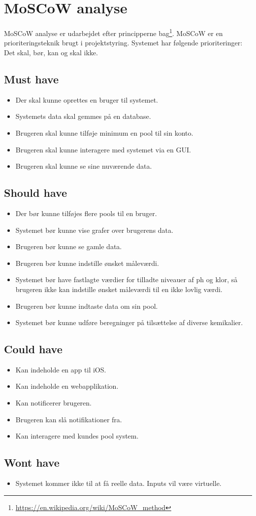 \section{MoSCoW analyse}
MoSCoW analyse er udarbejdet efter principperne bag\footnote{\url{https://en.wikipedia.org/wiki/MoSCoW_method}}. MoSCoW er en prioriteringsteknik brugt i projektstyring. Systemet har følgende prioriteringer: Det skal, bør, kan og skal ikke.

\subsection{Must have}
\begin{itemize}
	\item Der skal kunne oprettes en bruger til systemet.
	\item Systemets data skal gemmes på en database.  
	\item Brugeren skal kunne tilføje minimum en pool til sin konto. 
	\item Brugeren skal kunne interagere med systemet via en GUI. 
	\item Brugeren skal kunne se sine nuværende data.
\end{itemize}

\subsection{Should have}
\begin{itemize}
	\item Der bør kunne tilføjes flere pools til en bruger. 
	\item Systemet bør kunne vise grafer over brugerens data.
	\item Brugeren bør kunne se gamle data.
	\item Brugeren bør kunne indstille ønsket måleværdi.
	\item Systemet bør have fastlagte værdier for tilladte niveauer af ph og klor, så brugeren ikke kan indstille ønsket måleværdi til en ikke lovlig værdi.
	\item Brugeren bør kunne indtaste data om sin pool.
	\item Systemet bør kunne udføre beregninger på tilsættelse af diverse kemikalier.
\end{itemize}

\subsection{Could have}
\begin{itemize}
	\item Kan indeholde en app til iOS.
	\item Kan indeholde en webapplikation.
	\item Kan notificerer brugeren.
	\item Brugeren kan slå notifikationer fra.
	\item Kan interagere med kundes pool system.
\end{itemize}

\subsection{Wont have}
\begin{itemize}
	\item Systemet kommer ikke til at få reelle data. Inputs vil være virtuelle.
\end{itemize}

\newpage